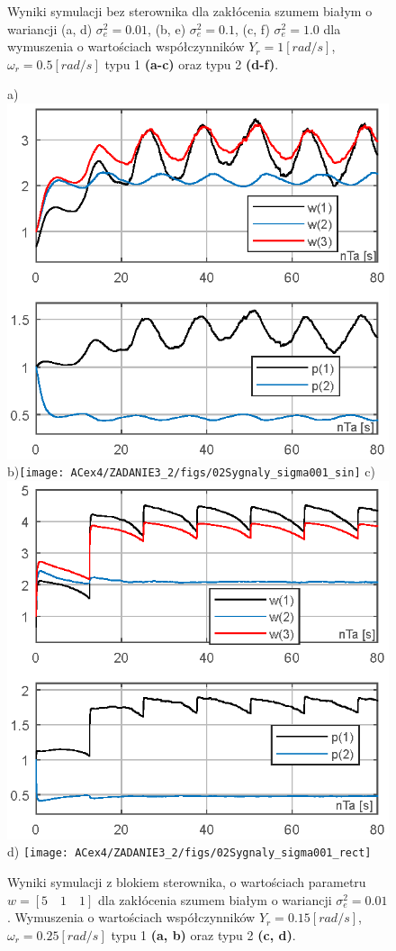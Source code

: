 \documentclass[10pt, a4paper]{article}
\begin{document}
\begin{figure}[ht]
{			Wyniki symulacji bez sterownika dla zakłócenia szumem białym o wariancji (a, d) $\sigma^2_e=0.01$, (b, e) $\sigma^2_e=0.1$, (c, f)  $\sigma^2_e=1.0$ dla wymuszenia o wartościach współczynników $Y_r=1[rad/s]$,  $\omega_r=0.5[rad/s]$ typu 1 \textbf{(a-c)} oraz typu 2 \textbf{(d-f)}.}
	\end{figure}
	\begin{figure}[ht]\centering	
	a) \includegraphics[width=0.22\columnwidth]{ACex4/ZADANIE3_2/figs/02Parametry_sigma001_sin} b)\texttt{[image: ACex4/ZADANIE3\_2/figs/02Sygnaly\_sigma001\_sin]} c)\includegraphics[width=0.22\columnwidth]{ACex4/ZADANIE3_2/figs/02Parametry_sigma001_rect}
	d) \texttt{[image: ACex4/ZADANIE3\_2/figs/02Sygnaly\_sigma001\_rect]} \caption{
		Wyniki symulacji z blokiem sterownika, o wartościach parametru $w=[5\quad1\quad1]$ dla zakłócenia szumem białym o wariancji 
		$\sigma^2_e=0.01$. Wymuszenia o wartościach współczynników 
		$Y_r=0.15[rad/s]$,  $\omega_r=0.25[rad/s]$ typu 1 \textbf{(a, b)} oraz typu 2 \textbf{(c, d)}.}
\end{figure}
\end{document}
